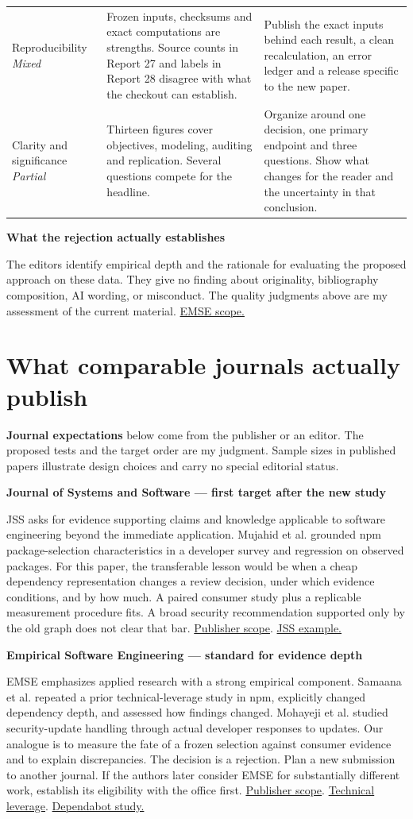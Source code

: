 \documentclass[11pt,a4paper]{article}
\newcommand{\pg}[1]{\newpage\section{\color{ink}#1}}
\newcommand{\hd}[1]{\par\textbf{\color{accent}#1}\par\nopagebreak}
\newcommand{\doi}[2]{\href{https://doi.org/#1}{#2}}
\begin{document}
\begin{tabularx}{\linewidth}{@{}p{.19\linewidth}XX@{}}
Reproducibility \newline \textit{Mixed} & Frozen inputs, checksums and exact computations are strengths. Source counts in Report 27 and labels in Report 28 disagree with what the checkout can establish. & Publish the exact inputs behind each result, a clean recalculation, an error ledger and a release specific to the new paper.\\
Clarity and significance \newline \textit{Partial} & Thirteen figures cover objectives, modeling, auditing and replication. Several questions compete for the headline. & Organize around one decision, one primary endpoint and three questions. Show what changes for the reader and the uncertainty in that conclusion.\\
\bottomrule
\end{tabularx}
\normalsize
\hd{What the rejection actually establishes}
The editors identify empirical depth and the rationale for evaluating the proposed approach on these data. They give no finding about originality, bibliography composition, AI wording, or misconduct. The quality judgments above are my assessment of the current material. \href{https://link.springer.com/journal/10664/aims-and-scope}{EMSE scope.}
\pg{What comparable journals actually publish}
\textbf{Journal expectations} below come from the publisher or an editor. The proposed tests and the target order are my judgment. Sample sizes in published papers illustrate design choices and carry no special editorial status.

\hd{Journal of Systems and Software — first target after the new study}
JSS asks for evidence supporting claims and knowledge applicable to software engineering beyond the immediate application. Mujahid et al. grounded npm package-selection characteristics in a developer survey and regression on observed packages. For this paper, the transferable lesson would be when a cheap dependency representation changes a review decision, under which evidence conditions, and by how much. A paired consumer study plus a replicable measurement procedure fits. A broad security recommendation supported only by the old graph does not clear that bar. \href{https://shop.elsevier.com/journals/journal-of-systems-and-software/0164-1212}{Publisher scope}. \doi{10.1016/j.jss.2022.111588}{JSS example.}

\hd{Empirical Software Engineering — standard for evidence depth}
EMSE emphasizes applied research with a strong empirical component. Samaana et al. repeated a prior technical-leverage study in npm, explicitly changed dependency depth, and assessed how findings changed. Mohayeji et al. studied security-update handling through actual developer responses to updates. Our analogue is to measure the fate of a frozen selection against consumer evidence and to explain discrepancies. The decision is a rejection. Plan a new submission to another journal. If the authors later consider EMSE for substantially different work, establish its eligibility with the office first. \href{https://link.springer.com/journal/10664/aims-and-scope}{Publisher scope}. \doi{10.1007/s10664-025-10648-8}{Technical leverage}. \doi{10.1007/s10664-025-10638-w}{Dependabot study.}
\end{document}
